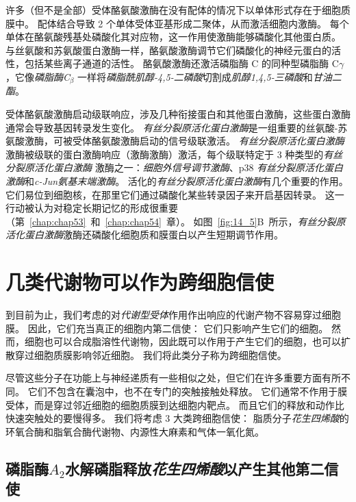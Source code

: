 许多（但不是全部）受体酪氨酸激酶在没有配体的情况下以单体形式存在于细胞质膜中。
配体结合导致 2 个单体受体亚基形成二聚体，从而激活细胞内激酶。
每个单体在酪氨酸残基处磷酸化其对应物，这一作用使激酶能够磷酸化其他蛋白质。
与丝氨酸和苏氨酸蛋白激酶一样，酪氨酸激酶调节它们磷酸化的神经元蛋白的活性，包括某些离子通道的活性。
酪氨酸激酶还激活磷脂酶 C 的同种型磷脂酶 C$\gamma$，它像\textit{磷脂酶C}$_\beta$ 一样将\textit{磷脂酰肌醇-4,5-二磷酸}切割成\textit{肌醇1,4,5-三磷酸}和\textit{甘油二酯}。


受体酪氨酸激酶启动级联响应，涉及几种衔接蛋白和其他蛋白激酶，这些蛋白激酶通常会导致基因转录发生变化。
\textit{有丝分裂原活化蛋白激酶}是一组重要的丝氨酸-苏氨酸激酶，可被受体酪氨酸激酶启动的信号级联激活。
\textit{有丝分裂原活化蛋白激酶}激酶被级联的蛋白激酶响应（激酶激酶）激活，每个级联特定于 3 种类型的\textit{有丝分裂原活化蛋白激酶} 激酶之一：\textit{细胞外信号调节激酶}、p38 \textit{有丝分裂原活化蛋白激酶}和\textit{c-Jun氨基末端激酶}。
活化的\textit{有丝分裂原活化蛋白激酶}有几个重要的作用。
它们易位到细胞核，在那里它们通过磷酸化某些转录因子来开启基因转录。
这一行动被认为对稳定长期记忆的形成很重要（第~\ref{chap:chap53}~和~\ref{chap:chap54}~章）。
如图~\ref{fig:14_5}B~所示，\textit{有丝分裂原活化蛋白激酶}激酶还磷酸化细胞质和膜蛋白以产生短期调节作用。



\section{几类代谢物可以作为跨细胞信使}

到目前为止，我们考虑的对\textit{代谢型受体}作用作出响应的代谢产物不容易穿过细胞膜。
因此，它们充当真正的细胞内第二信使：
它们只影响产生它们的细胞。
然而，细胞也可以合成脂溶性代谢物，因此既可以作用于产生它们的细胞，也可以扩散穿过细胞质膜影响邻近细胞。
我们将此类分子称为跨细胞信使。


尽管这些分子在功能上与神经递质有一些相似之处，但它们在许多重要方面有所不同。
它们不包含在囊泡中，也不在专门的突触接触处释放。
它们通常不作用于膜受体，而是穿过邻近细胞的细胞质膜到达细胞内靶点。
而且它们的释放和动作比快速突触处的要慢得多。
我们将考虑 3 大类跨细胞信使：
脂质分子\textit{花生四烯酸}的环氧合酶和脂氧合酶代谢物、内源性大麻素和气体一氧化氮。



\subsection{磷脂酶$A_2$水解磷脂释放\textit{花生四烯酸}以产生其他第二信使}

